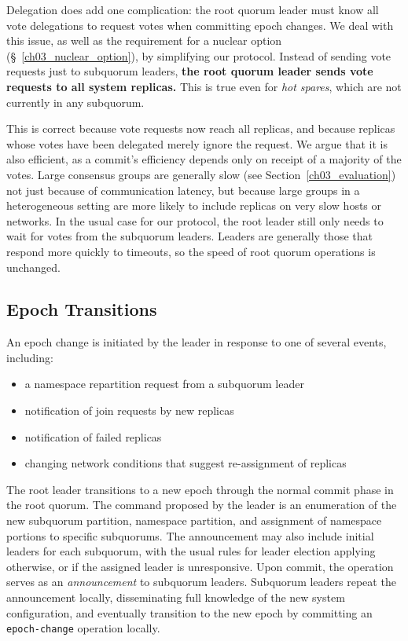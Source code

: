 Delegation does add one complication: the root quorum leader must know all vote delegations to request votes when committing epoch changes.
We deal with this issue, as well as the requirement for a nuclear option (\S~\ref{ch03_nuclear_option}), by simplifying our protocol.
Instead of sending vote requests just to subquorum leaders, \textbf{the root quorum leader sends vote requests to all system replicas.}
This is true even for \emph{hot spares}, which are not currently in any subquorum.

This is correct because vote requests now reach all replicas, and because replicas whose votes have been delegated merely ignore the request.
We argue that it is also efficient, as a commit's efficiency depends only on receipt of a majority of the votes.
Large consensus groups are generally slow (see Section~\ref{ch03_evaluation}) not just because of communication latency, but because large groups in a heterogeneous setting are more likely to include replicas on very slow hosts or networks.
In the usual case for our protocol, the root leader still only needs to wait for votes from the subquorum leaders.
Leaders are generally those that respond more quickly to timeouts, so the
speed of root quorum operations is unchanged.

\subsection{Epoch Transitions}
\label{ch03_epoch_transitions}


An epoch change is initiated by the leader in response to one of several events, including:

\renewcommand{\baselinestretch}{1}
\begin{itemize}
    \item a namespace repartition request from a subquorum leader
    \item notification of join requests by new replicas
    \item notification of failed replicas
    \item changing network conditions that suggest re-assignment of replicas
\end{itemize}
\renewcommand{\baselinestretch}{2}

The root leader transitions to a new epoch through the normal commit phase in the root quorum.
The command proposed by the leader is an enumeration of the new subquorum partition, namespace partition, and assignment of namespace portions to specific subquorums.
The announcement may also include initial leaders for each subquorum, with the usual rules for leader election applying otherwise, or if the assigned leader is unresponsive.
Upon commit, the operation serves as an \emph{announcement} to subquorum leaders.
Subquorum leaders repeat the announcement locally, disseminating full knowledge of the new system configuration, and eventually transition to the new epoch by committing an \texttt{epoch-change} operation locally.

